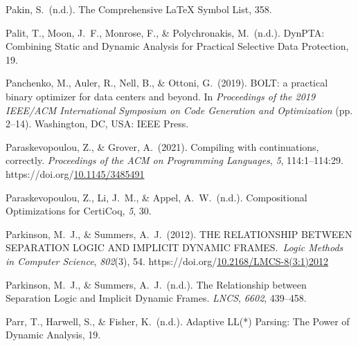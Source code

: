 \documentclass[12pt,twoside]{article}
\begin{document}
{\begin{thebibliography}{1079}
\mdbibitemlabel{}Pakin, S.~(n.d.). The Comprehensive LaTeX Symbol List, 358.%

\mdbibitemlabel{}Palit, T., Moon, J.~F., Monrose, F., \& Polychronakis, M.~(n.d.). DynPTA: Combining Static and Dynamic Analysis for Practical Selective Data Protection, 19.%

\mdbibitemlabel{}Panchenko, M., Auler, R., Nell, B., \& Ottoni, G.~(2019). BOLT: a practical binary optimizer for data centers and beyond. In \emph{Proceedings of the 2019 IEEE/ACM International Symposium on Code Generation and Optimization} (pp. 2–14). Washington, DC, USA: IEEE Press.%

\mdbibitemlabel{}Paraskevopoulou, Z., \& Grover, A.~(2021). Compiling with continuations, correctly. \emph{Proceedings of the ACM on Programming Languages}, \emph{5}, 114:1–114:29. https://doi.org/\href{https://dx.doi.org/10.1145/3485491}{10.1145/3485491}%

\mdbibitemlabel{}Paraskevopoulou, Z., Li, J.~M., \& Appel, A.~W.~(n.d.). Compositional Optimizations for CertiCoq, \emph{5}, 30.%

\mdbibitemlabel{}Parkinson, M.~J., \& Summers, A.~J.~(2012). THE RELATIONSHIP BETWEEN SEPARATION LOGIC AND IMPLICIT DYNAMIC FRAMES.~\emph{Logic Methods in Computer Science}, \emph{802}(3), 54. https://doi.org/\href{https://dx.doi.org/10.2168/LMCS-8\%25283:1\%25292012}{10.2168/LMCS-8(3:1)2012}%

\mdbibitemlabel{}Parkinson, M.~J., \& Summers, A.~J.~(n.d.). The Relationship between Separation Logic and Implicit Dynamic Frames. \emph{LNCS}, \emph{6602}, 439–458.%

\mdbibitemlabel{}Parr, T., Harwell, S., \& Fisher, K.~(n.d.). Adaptive LL(*) Parsing: The Power of Dynamic Analysis, 19.%


\end{thebibliography}}
\end{document}
